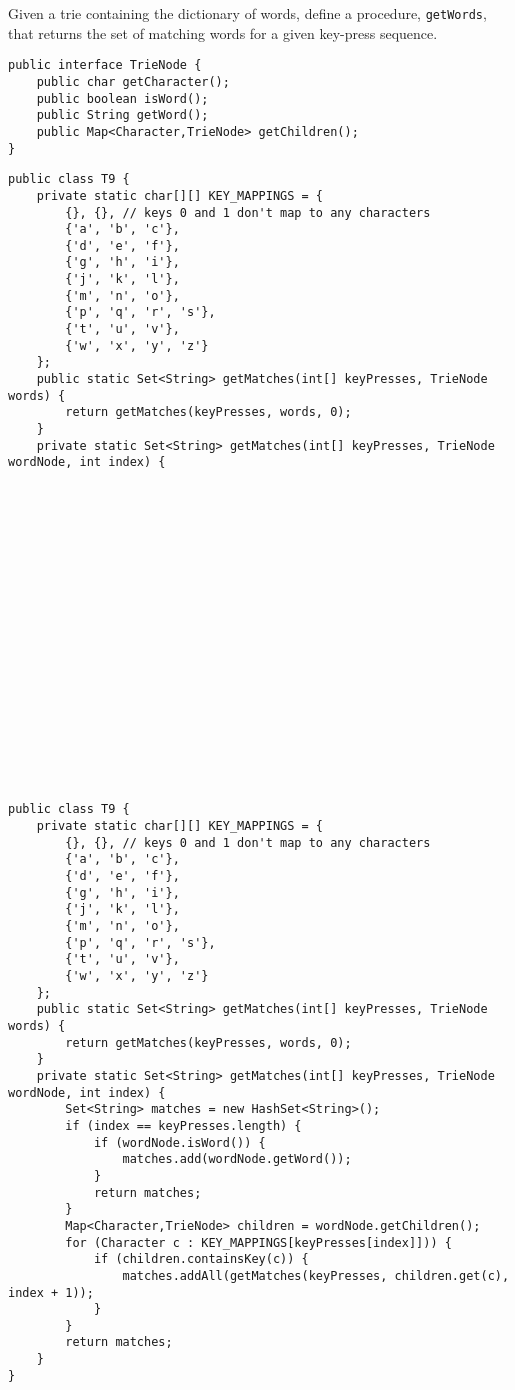 \question Given a trie containing the dictionary of words, define a procedure, \texttt{getWords}, that returns the set of matching words for a given key-press sequence.

\begin{lstlisting}
public interface TrieNode {
    public char getCharacter();
    public boolean isWord();
    public String getWord();
    public Map<Character,TrieNode> getChildren();
}
\end{lstlisting}

\ifprintanswers\else
\begin{lstlisting}
public class T9 {
    private static char[][] KEY_MAPPINGS = {
        {}, {}, // keys 0 and 1 don't map to any characters
        {'a', 'b', 'c'},
        {'d', 'e', 'f'},
        {'g', 'h', 'i'},
        {'j', 'k', 'l'},
        {'m', 'n', 'o'},
        {'p', 'q', 'r', 's'},
        {'t', 'u', 'v'},
        {'w', 'x', 'y', 'z'}
    };
    public static Set<String> getMatches(int[] keyPresses, TrieNode words) {
        return getMatches(keyPresses, words, 0);
    }
    private static Set<String> getMatches(int[] keyPresses, TrieNode wordNode, int index) {




















\end{lstlisting}
\fi

\begin{solution}
\begin{lstlisting}
public class T9 {
    private static char[][] KEY_MAPPINGS = {
        {}, {}, // keys 0 and 1 don't map to any characters
        {'a', 'b', 'c'},
        {'d', 'e', 'f'},
        {'g', 'h', 'i'},
        {'j', 'k', 'l'},
        {'m', 'n', 'o'},
        {'p', 'q', 'r', 's'},
        {'t', 'u', 'v'},
        {'w', 'x', 'y', 'z'}
    };
    public static Set<String> getMatches(int[] keyPresses, TrieNode words) {
        return getMatches(keyPresses, words, 0);
    }
    private static Set<String> getMatches(int[] keyPresses, TrieNode wordNode, int index) {
        Set<String> matches = new HashSet<String>();
        if (index == keyPresses.length) {
            if (wordNode.isWord()) {
                matches.add(wordNode.getWord());
            }
            return matches;
        }
        Map<Character,TrieNode> children = wordNode.getChildren();
        for (Character c : KEY_MAPPINGS[keyPresses[index]])) {
            if (children.containsKey(c)) {
                matches.addAll(getMatches(keyPresses, children.get(c), index + 1));
            }
        }
        return matches;
    }
}
\end{lstlisting}
\end{solution}